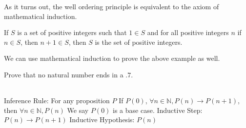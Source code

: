 As it turns out, the well ordering principle is equivalent to the axiom of mathematical induction.

\begin{defn}
If $S$ is a set of positive integers such that $1 \in S$ and
for all positive integers $n$ if $n \in S$, then $n + 1 \in S$, then $S$ is the set of positive integers.
\end{defn}
We can use mathematical induction to prove the above example as well.
\begin{exmp} Prove that no natural number ends in a $.7$.
\vspace{3cm}
\end{exmp}



\begin{defn}[Induction] $ $\\
Inference Rule:
\newline
For any proposition $P$
\newline
If $P(0)$, $\forall n \in \mathbb{N},P(n) \to P(n+1)$, then $\forall n \in \mathbb{N}, P(n)$
\newline
We say $P(0)$ is a base case.
\newline
Inductive Step: $P(n) \to P(n+1)$
\newline
Inductive Hypothesis: $P(n)$
\end{defn}

